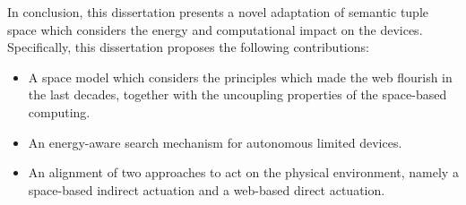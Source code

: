 \begin{abstracts}
In conclusion, this dissertation presents a novel adaptation of semantic tuple space which considers the energy and computational impact on the devices.
Specifically, this dissertation proposes the following contributions:
\begin{itemize}
  \item A space model which considers the principles which made the web flourish in the last decades, together with the uncoupling properties of the space-based computing.
  \item An energy-aware search mechanism for autonomous limited devices.
  \item An alignment of two approaches to act on the physical environment, namely a space-based indirect actuation and a web-based direct actuation.
\end{itemize}

\end{abstracts}




